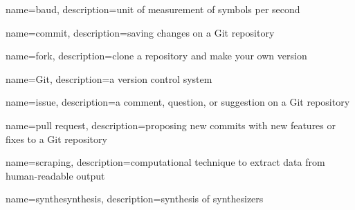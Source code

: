 {
    name={baud},
    description={unit of measurement of symbols per second}
}

{
    name={commit},
    description={saving changes on a Git repository}
}

{
    name={fork},
    description={clone a repository and make your own version}
}

{
    name={Git},
    description={a version control system}
}

{
    name={issue},
    description={a comment, question, or suggestion on a Git repository}
}

{
    name={pull request},
    description={proposing new commits with new features or fixes to a Git repository}
}

{
    name={scraping},
    description={computational technique to extract data from human-readable output}
}

{
    name={synthesynthesis},
    description={synthesis of synthesizers}
}
